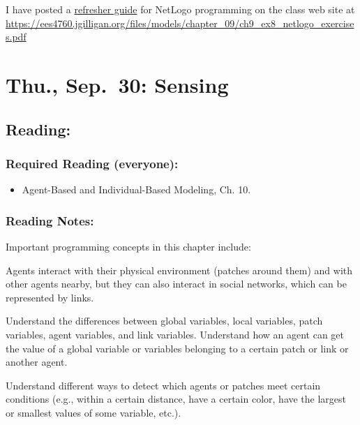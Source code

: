 \documentclass[
]{article}
\providecommand{\tightlist}{%
  \setlength{\itemsep}{0pt}\setlength{\parskip}{0pt}}
\begin{document}
I have posted a
\href{/files/models/chapter_09/ch9_ex8_netlogo_exercises.pdf}{refresher
guide} for NetLogo programming on the class web site at
\url{https://ees4760.jgilligan.org/files/models/chapter_09/ch9_ex8_netlogo_exercises.pdf}

\hypertarget{thu.-sep.-30-sensing}{%
\section{Thu., Sep.~30: Sensing}\label{thu.-sep.-30-sensing}}

\hypertarget{reading-10}{%
\subsection{Reading:}\label{reading-10}}

\hypertarget{required-reading-everyone-9}{%
\subsubsection{Required Reading
(everyone):}\label{required-reading-everyone-9}}

\begin{itemize}
\tightlist
\item
  Agent-Based and Individual-Based Modeling, Ch. 10.
\end{itemize}

\hypertarget{reading-notes-9}{%
\subsubsection{Reading Notes:}\label{reading-notes-9}}

Important programming concepts in this chapter include:

\begin{description}
\tightlist
\item[Links:]
Agents interact with their physical environment (patches around them)
and with other agents nearby, but they can also interact in social
networks, which can be represented by links.
\item[Variable scope:]
Understand the differences between global variables, local variables,
patch variables, agent variables, and link variables. Understand how an
agent can get the value of a global variable or variables belonging to a
certain patch or link or another agent.
\item[Entity detection:]
Understand different ways to detect which agents or patches meet certain
conditions (e.g., within a certain distance, have a certain color, have
the largest or smallest values of some variable, etc.).
\end{description}
\end{document}
